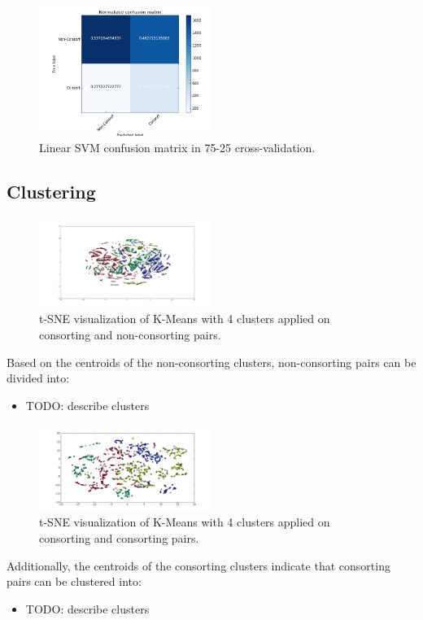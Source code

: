 \documentclass[twoside,twocolumn,paper=letter]{article}
\begin{document}
\begin{figure}
      \centering
          \includegraphics[width=0.5\textwidth]{../figs/linearSVM_CM.png}
  \caption{Linear SVM confusion matrix in 75-25 cross-validation.}
  \label{fig:cm_lin_vis}
\end{figure}


\subsection{Clustering}
\begin{figure}[h]
      \centering
          \includegraphics[width=0.5\textwidth]{../figs/non_consort_kmeans_2d_tsne.png}
  \caption{t-SNE visualization of K-Means with 4 clusters applied on consorting
  and non-consorting pairs.}
  \label{fig:non_consort_clustering_vis}
\end{figure}
Based on the centroids of the non-consorting clusters, non-consorting pairs can
be divided into:
\begin{itemize}
  \item{TODO: describe clusters}
\end{itemize}
\begin{figure}[h]
      \centering
          \includegraphics[width=0.5\textwidth]{../figs/consort_kmeans_2d_tsne.png}
  \caption{t-SNE visualization of K-Means with 4 clusters applied on consorting
  and consorting pairs.}
  \label{fig:consort_clustering_vis}
\end{figure}
Additionally, the centroids of the consorting clusters indicate that consorting
pairs can be clustered into:
\begin{itemize}
  \item{TODO: describe clusters}
\end{itemize}
\end{document}
